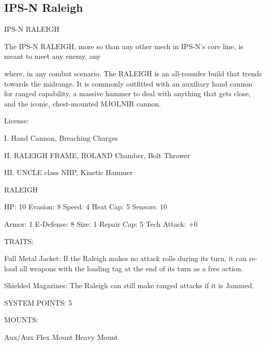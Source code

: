 \subsection{IPS-N Raleigh}
                                                             
                                              IPS-N RALEIGH  

The IPS-N RALEIGH, more so than any other mech in IPS-N’s core line, is meant to meet any enemy, any  

where, in any combat scenario. The RALEIGH is an all-rounder build that trends towards the midrange. It is  
commonly outfitted with an auxiliary hand cannon for ranged capability, a massive hammer to deal with  
anything that gets close, and the iconic, chest-mounted MJOLNIR cannon.  

                                                      License:
 
I. Hand Cannon, Breaching Charges
 
II. RALEIGH FRAME, ROLAND Chamber, Bolt Thrower
 
III. UNCLE class NHP, Kinetic Hammer
 

                                                                                                                  


                                                    RALEIGH 

  HP: 10          Evasion: 8                              Speed: 4            Heat Cap: 5         Sensors: 10 

  Armor: 1        E-Defense: 8                            Size: 1             Repair Cap: 5       Tech Attack:  
                                                                                                  +0 

                                                      TRAITS: 

  Full Metal Jacket: If the Raleigh makes no attack rolls during its turn, it can re-load all weapons with  
  the loading tag at the end of its turn as a free action.
 
  Shielded Magazines: The Raleigh can still make ranged attacks if it is Jammed. 

                                               SYSTEM POINTS: 5 

                                                     MOUNTS: 

  Aux/Aux                             Flex Mount                              Heavy Mount 

